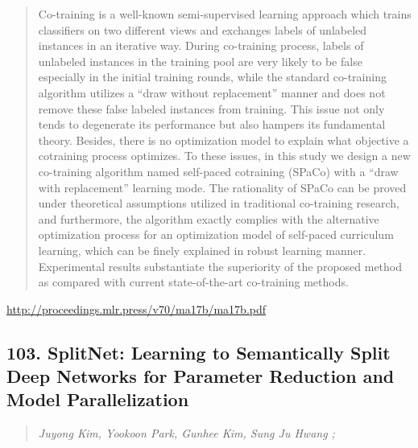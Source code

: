 \documentclass{article}
\begin{document}
\begin{quote}
    Co-training is a well-known semi-supervised learning approach which trains classifiers on two different views and exchanges labels of unlabeled instances in an iterative way. During co-training process, labels of unlabeled instances in the training pool are very likely to be false especially in the initial training rounds, while the standard co-training algorithm utilizes a “draw without replacement” manner and does not remove these false labeled instances from training. This issue not only tends to degenerate its performance but also hampers its fundamental theory. Besides, there is no optimization model to explain what objective a cotraining process optimizes. To these issues, in this study we design a new co-training algorithm named self-paced cotraining (SPaCo) with a “draw with replacement” learning mode. The rationality of SPaCo can be proved under theoretical assumptions utilized in traditional co-training research, and furthermore, the algorithm exactly complies with the alternative optimization process for an optimization model of self-paced curriculum learning, which can be finely explained in robust learning manner. Experimental results substantiate the superiority of the proposed method as compared with current state-of-the-art co-training methods.  
\end{quote}

\href{http://proceedings.mlr.press/v70/ma17b/ma17b.pdf}{http://proceedings.mlr.press/v70/ma17b/ma17b.pdf}

\subsection{103. SplitNet: Learning to Semantically Split Deep Networks for Parameter Reduction and Model Parallelization}

\begin{quote}
\footnotesize{\textit{Juyong Kim, Yookoon Park, Gunhee Kim, Sung Ju Hwang ;}}

\end{quote}
\end{document}
